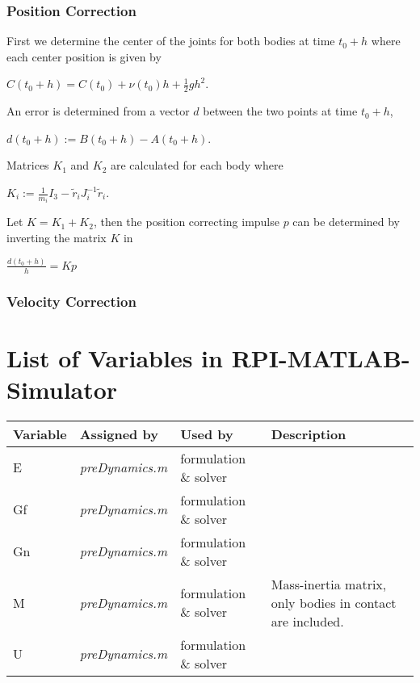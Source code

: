 \documentclass{article}
\begin{document}
\subsubsection{Position Correction}
First we determine the center of the joints for both bodies at time $t_0+h$ where each center position is given by
\begin{center}
$C(t_0+h) = C(t_0) + \nu(t_0) h + \frac{1}{2} g h^2$.
\end{center}
An error is determined from a vector $d$ between the two points at time $t_0+h$, 
\begin{center}
$d(t_0+h) := B(t_0+h) - A(t_0+h)$.
\end{center}
Matrices $K_1$ and $K_2$ are calculated for each body where 
\begin{center}
$K_i := \frac{1}{m_i} I_3 - \tilde{r}_i  J_i^{-1} \tilde{r}_i$.
\end{center}
Let $K = K_1+K_2$, then the position correcting impulse $p$ can be determined by inverting the matrix $K$ in 
\begin{center}
$\frac{d(t_0+h)}{h} = K p$
\end{center}


\subsubsection{Velocity Correction}

\newpage
\appendix

\section{List of Variables in RPI-MATLAB-Simulator}
\begin{tabular}{ l | l | l | p{5cm} }
\textbf{Variable} & \textbf{Assigned by} & \textbf{Used by} & \textbf{Description} \\ \hline
  E &  \emph{preDynamics.m} & formulation \& solver &    \\
  Gf &  \emph{preDynamics.m} & formulation \& solver &    \\
  Gn & \emph{preDynamics.m} & formulation \& solver &     \\
  M & \emph{preDynamics.m} & formulation \& solver &  Mass-inertia matrix, only bodies in contact are included.  \\
  U &  \emph{preDynamics.m} & formulation \& solver &    \\
\end{tabular}
\end{document}
